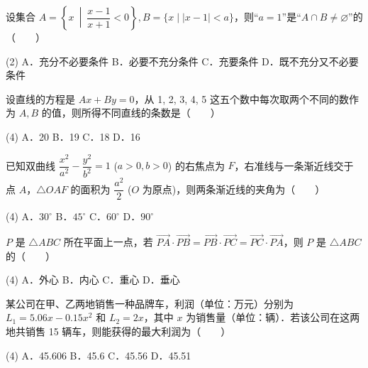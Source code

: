 \begin{question}
设集合 $A = \left\{x \ \middle|\ \dfrac{x - 1}{x + 1} < 0\right\}, B = \{x \mid |x - 1| < a\}$，则“$a = 1$”是“$A \cap B \neq \varnothing$”的\mbox{（　　）}

\begin{gkopts}(2)
\task A．充分不必要条件
\task B．必要不充分条件
\task C．充要条件
\task D．既不充分又不必要条件
\end{gkopts}

\end{question}
\begin{question}
设直线的方程是 $Ax + By = 0$，从 1, 2, 3, 4, 5 这五个数中每次取两个不同的数作为 $A, B$ 的值，则所得不同直线的条数是\mbox{（　　）}

\begin{gkopts}(4)
\task A．20
\task B．19
\task C．18
\task D．16
\end{gkopts}

\end{question}
\begin{question}
已知双曲线 $\dfrac{x^2}{a^2} - \dfrac{y^2}{b^2} = 1$ ($a > 0, b > 0$) 的右焦点为 $F$，右准线与一条渐近线交于点 $A$，$\triangle OAF$ 的面积为 $\dfrac{a^2}{2}$ ($O$ 为原点)，则两条渐近线的夹角为\mbox{（　　）}

\begin{gkopts}(4)
\task A．$30^\circ$
\task B．$45^\circ$
\task C．$60^\circ$
\task D．$90^\circ$
\end{gkopts}

\end{question}
\begin{question}
$P$ 是 $\triangle ABC$ 所在平面上一点，若 $\vec{PA} \cdot \vec{PB} = \vec{PB} \cdot \vec{PC} = \vec{PC} \cdot \vec{PA}$，则 $P$ 是 $\triangle ABC$ 的\mbox{（　　）}

\begin{gkopts}(4)
\task A．外心
\task B．内心
\task C．重心
\task D．垂心
\end{gkopts}

\end{question}
\begin{question}
某公司在甲、乙两地销售一种品牌车，利润（单位：万元）分别为 $L_1 = 5.06x - 0.15x^2$ 和 $L_2 = 2x$，其中 $x$ 为销售量（单位：辆）．若该公司在这两地共销售 15 辆车，则能获得的最大利润为\mbox{（　　）}

\begin{gkopts}(4)
\task A．45.606
\task B．45.6
\task C．45.56
\task D．45.51
\end{gkopts}

\end{question}

